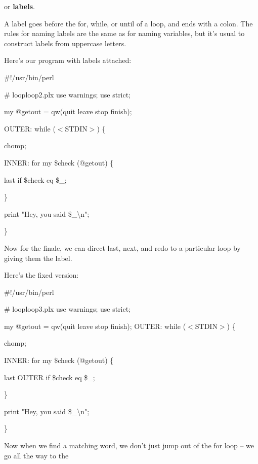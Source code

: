 \documentclass[a4paper,11pt]{book}
\begin{document}
\noindent or \textbf{labels}.

\noindent 

\noindent A label goes before the for, while, or until of a loop, and ends with a colon. The rules for naming labels are the same as for naming variables, but it's usual to construct labels from uppercase letters.

\noindent 

\noindent Here's our program with labels attached:

\noindent 

\noindent \#!/usr/bin/perl

\noindent \# looploop2.plx use warnings; use strict;

\noindent 

\noindent my @getout = qw(quit leave stop finish);

\noindent 

\noindent OUTER: while ($<$STDIN$>$) \{

\noindent chomp;

\noindent INNER: for my \$check (@getout) \{

\noindent last if \$check eq \$\_;

\noindent \}

\noindent print "Hey, you said \$\_\textbackslash n";

\noindent \}

\noindent 

\noindent Now for the finale, we can direct last, next, and redo to a particular loop by giving them the label.

\noindent Here's the fixed version:

\noindent 

\noindent \#!/usr/bin/perl

\noindent \# looploop3.plx use warnings; use strict;

\noindent my @getout = qw(quit leave stop finish); OUTER: while ($<$STDIN$>$) \{

\noindent chomp;

\noindent INNER: for my \$check (@getout) \{

\noindent last OUTER if \$check eq \$\_;

\noindent \}

\noindent print "Hey, you said \$\_\textbackslash n";

\noindent \}

\noindent 

\noindent Now when we find a matching word, we don't just jump out of the for loop -- we go all the way to the
\end{document}
